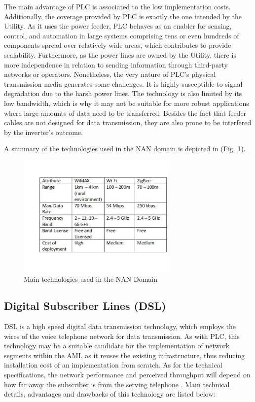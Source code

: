 \documentclass[11pt,draftclsnofoot,onecolumn]{IEEEtran}
\begin{document}
The main advantage of PLC is associated to the low implementation costs. Additionally, the coverage provided by PLC is exactly the one intended by the Utility. As it uses the power feeder, PLC behaves as an enabler for sensing, control, and automation in large systems comprising tens or even hundreds of components spread over relatively wide areas, which contributes to provide scalability. Furthermore, as the power lines are owned by the Utility, there is more independence in relation to sending information through third-party networks or operators. Nonetheless, the very nature of  PLC's physical transmission media generates some challenges. It is highly susceptible to signal degradation due to the harsh power lines. The technology is also limited by its low bandwidth, which is why it may not be suitable for more robust applications where large amounts of data need to be transferred. Besides the fact that feeder cables are not designed for data transmission, they are also prone to be interfered by the inverter’s outcome. %

A summary of the technologies used in the NAN domain is depicted in (Fig. \ref{fig:nan}).

\begin{figure}[h!]
\centering
\includegraphics [height=6cm] {NANTechnologies}
\caption{Main technologies used in the NAN Domain}
\label{fig:nan}
\end{figure}


\subsection{Digital Subscriber Lines (DSL)}\label{dsl}
DSL is a high speed digital data transmission technology, which employs the wires of the voice telephone network for data transmission. As with PLC, this technology may be a suitable candidate for the implementation of network segments within the AMI, as it reuses the existing infrastructure, thus reducing installation cost of an implementation from scratch. As for the technical specifications, the network performance and perceived throughput will depend on how far away the subscriber is from the serving telephone  \cite{Gungor2011}. Main technical details, advantages and drawbacks of this technology are listed below:
\end{document}
